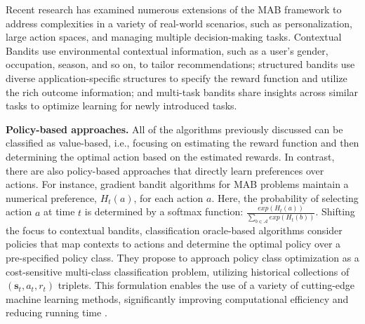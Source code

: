 Recent research has examined numerous extensions of the \acrshort{MAB} framework to address complexities in a variety of real-world scenarios, 
such as personalization, large action spaces, and managing multiple decision-making tasks. 
Contextual Bandits \citep{chu2011contextual,agrawal2013thompson,kveton2020randomized,li2010contextual} use environmental contextual information, such as a user's gender, occupation, season, and so on, to tailor recommendations; 
structured bandits \citep{agrawal2017thompson,kveton2015cascading,chen2013combinatorial,wan2023towards} use diverse application-specific structures to specify the reward function and utilize the rich outcome information; 
and multi-task bandits \citep{kveton2021meta, wan2021metadata,hong2022hierarchical,basu2021no} share insights across similar tasks to optimize learning for newly introduced tasks. 

\textbf{Policy-based approaches. }
All of the algorithms previously discussed can be classified as value-based, i.e., focusing on estimating the reward function and then determining the optimal action based on the estimated rewards. 
In contrast, there are also policy-based approaches that directly learn preferences over actions. 
For instance, gradient bandit algorithms \citep{sutton2018reinforcement,mei2023stochastic} for \acrshort{MAB} problems maintain a numerical preference, $H_t(a)$, for each action $a$. 
Here, the probability of selecting action $a$ at time $t$ is determined by a softmax function: $\frac{exp(H_t(a))}{\sum_{b\in\mathcal{A}}exp(H_{t}(b))}$. Shifting the focus to contextual bandits, classification oracle-based algorithms \citep{slivkins2019introduction, langford2007epoch, dudik2011efficient, agarwal2014taming, krishnamurthy2016contextual} consider policies that map contexts to actions and determine the optimal policy over a pre-specified policy class. They propose to approach policy class optimization as a cost-sensitive multi-class classification problem, utilizing historical collections of $(\boldsymbol{s}_t, a_t, r_t)$ triplets. This formulation enables the use of a variety of cutting-edge machine learning methods, significantly improving computational efficiency and reducing running time \citep{slivkins2019introduction}.

